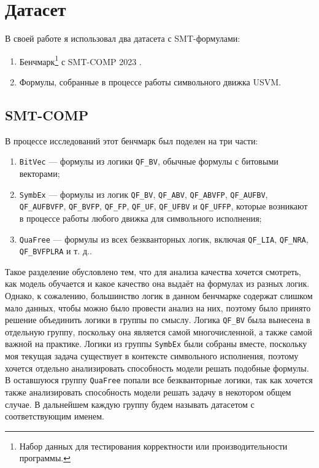 
\section{Датасет} \label{datasets}

В своей работе я использовал два датасета с SMT-формулами:

\begin{enumerate}
    \item Бенчмарк\footnote{Набор данных для тестирования корректности или производительности программы.} с SMT-COMP 2023 \cite{smt-comp-2023-benchmarks}.
    \item Формулы, собранные в процессе работы символьного движка USVM.
\end{enumerate}


\subsection{SMT-COMP}

В процессе исследований этот бенчмарк был поделен на три части:

\begin{enumerate}
    \item \texttt{BitVec} --- формулы из логики \texttt{QF\_BV}, обычные формулы с битовыми векторами;
    \item \texttt{SymbEx} --- формулы из логик \texttt{QF\_BV}, \texttt{QF\_ABV}, \texttt{QF\_ABVFP}, \texttt{QF\_AUFBV}, \\ \texttt{QF\_AUFBVFP}, \texttt{QF\_BVFP}, \texttt{QF\_FP}, \texttt{QF\_UF}, \texttt{QF\_UFBV} и \texttt{QF\_UFFP}, которые возникают в процессе работы любого движка для символьного исполнения;
    \item \texttt{QuaFree} --- формулы из всех безкванторных логик, включая \texttt{QF\_LIA}, \texttt{QF\_NRA}, \texttt{QF\_BVFPLRA} и т. д..
\end{enumerate}

Такое разделение обусловлено тем, что для анализа качества хочется смотреть, как модель обучается и какое качество она выдаёт на формулах из разных логик. Однако, к сожалению, большинство логик в данном бенчмарке содержат слишком мало данных, чтобы можно было провести анализ на них, поэтому было принято решение объединить логики в группы по смыслу. Логика \texttt{QF\_BV} была вынесена в отдельную группу, поскольку она является самой многочисленной, а также самой важной на практике. Логики из группы \texttt{SymbEx} были собраны вместе, поскольку моя текущая задача существует в контексте символьного исполнения, поэтому хочется отдельно анализировать способность модели решать подобные формулы. В оставшуюся группу \texttt{QuaFree} попали все безкванторные логики, так как хочется также анализировать способность модели решать задачу в некотором общем случае. В дальнейшем каждую группу будем называть датасетом с соответствующим именем.

